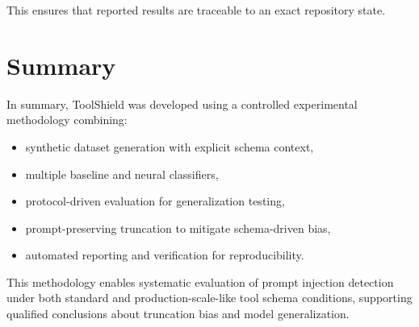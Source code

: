 This ensures that reported results are traceable to an exact repository state.

\section{Summary}
\label{subsec:methodology_summary}

In summary, ToolShield was developed using a controlled experimental methodology combining:

\begin{itemize}
    \item synthetic dataset generation with explicit schema context,
    \item multiple baseline and neural classifiers,
    \item protocol-driven evaluation for generalization testing,
    \item prompt-preserving truncation to mitigate schema-driven bias,
    \item automated reporting and verification for reproducibility.
\end{itemize}

This methodology enables systematic evaluation of prompt injection detection under both standard and production-scale-like tool schema conditions, supporting qualified conclusions about truncation bias and model generalization.
